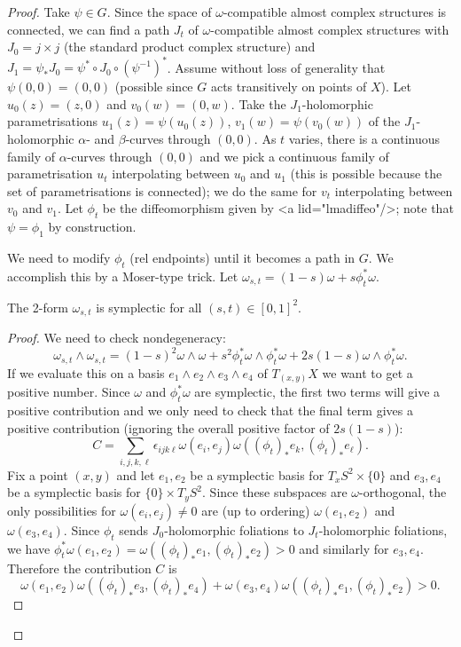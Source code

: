 \documentclass{article}
\begin{document}
\begin{proof}
  Take $\psi\in G$. Since the space of $\omega$-compatible almost complex structures is connected, we can find a path $J_t$ of $\omega$-compatible almost complex structures with $J_0=j\times j$ (the standard product complex structure) and $J_1=\psi_*J_0=\psi^*\circ J_0\circ(\psi^{-1})^*$. Assume without loss of generality that $\psi(0,0)=(0,0)$ (possible since $G$ acts transitively on points of $X$). Let $u_0(z)=(z,0)$ and $v_0(w)=(0,w)$. Take the $J_1$-holomorphic parametrisations $u_1(z)=\psi(u_0(z))$, $v_1(w)=\psi(v_0(w))$ of the $J_1$-holomorphic $\alpha$- and $\beta$-curves through $(0,0)$. As $t$ varies, there is a continuous family of $\alpha$-curves through $(0,0)$ and we pick a continuous family of parametrisation $u_t$ interpolating between $u_0$ and $u_1$ (this is possible because the set of parametrisations is connected); we do the same for $v_t$ interpolating between $v_0$ and $v_1$. Let $\phi_t$ be the diffeomorphism given by <a lid="lmadiffeo"/>; note that $\psi=\phi_1$ by construction.

  We need to modify $\phi_t$ (rel endpoints) until it becomes a path in $G$. We accomplish this by a Moser-type trick. Let $\omega_{s,t}=(1-s)\omega+s\phi_t^*\omega$.

  \begin{Lemma}
    The 2-form $\omega_{s,t}$ is symplectic for all $(s,t)\in[0,1]^2$.
  \end{Lemma}
  \begin{proof}
    We need to check nondegeneracy:
    \[\omega_{s,t}\wedge\omega_{s,t}=(1-s)^2\omega\wedge\omega+s^2\phi_t^*\omega\wedge\phi_t^*\omega+2s(1-s)\omega\wedge\phi_t^*\omega.\]
    If we evaluate this on a basis $e_1\wedge e_2\wedge e_3\wedge e_4$ of $T_{(x,y)}X$ we want to get a positive number. Since $\omega$ and $\phi_t^*\omega$ are symplectic, the first two terms will give a positive contribution and we only need to check that the final term gives a positive contribution (ignoring the overall positive factor of $2s(1-s)$):
    \[C=\sum_{i,j,k,\ell}\epsilon_{ijk\ell}\omega(e_i,e_j)\omega((\phi_t)_*e_k,(\phi_t)_*e_\ell).\]
    Fix a point $(x,y)$ and let $e_1,e_2$ be a symplectic basis for $T_xS^2\times\{0\}$ and $e_3,e_4$ be a symplectic basis for $\{0\}\times T_yS^2$. Since these subspaces are $\omega$-orthogonal, the only possibilities for $\omega(e_i,e_j)\neq 0$ are (up to ordering) $\omega(e_1,e_2)$ and $\omega(e_3,e_4)$. Since $\phi_t$ sends $J_0$-holomorphic foliations to $J_t$-holomorphic foliations, we have $\phi_t^*\omega(e_1,e_2)=\omega((\phi_t)_*e_1,(\phi_t)_*e_2)>0$ and similarly for $e_3,e_4$. Therefore the contribution $C$ is
    \[\omega(e_1,e_2)\omega((\phi_t)_*e_3,(\phi_t)_*e_4)+\omega(e_3,e_4)\omega((\phi_t)_*e_1,(\phi_t)_*e_2)>0.\]
  \end{proof}
  

\end{proof}
\end{document}
